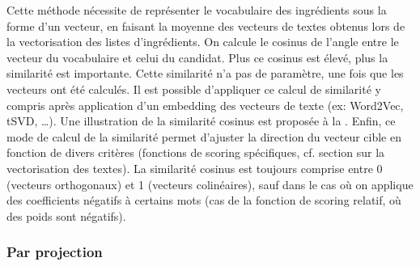             Cette méthode nécessite de représenter le vocabulaire des ingrédients sous la forme d'un vecteur, en faisant la moyenne des vecteurs de textes obtenus lors de la vectorisation des listes d'ingrédients.
            On calcule le cosinus de l'angle entre le vecteur du vocabulaire et celui du candidat.
            Plus ce cosinus est élevé, plus la similarité est importante.
            Cette similarité n'a pas de paramètre, une fois que les vecteurs ont été calculés.
            Il est possible d'appliquer ce calcul de similarité y compris après application d'un embedding des vecteurs de texte (ex: Word2Vec, tSVD, \dots).
            Une illustration de la similarité cosinus est proposée à la .
            Enfin, ce mode de calcul de la similarité permet d'ajuster la direction du vecteur cible en fonction de divers critères (fonctions de scoring spécifiques, cf. section  sur la vectorisation des textes).
            La similarité cosinus est toujours comprise entre 0 (vecteurs orthogonaux) et 1 (vecteurs colinéaires), sauf dans le cas où on applique des coefficients négatifs à certains mots (cas de la fonction de scoring relatif, où des poids sont négatifs).

            \subsubsection{Par projection}
            \label{similarite_projection}

